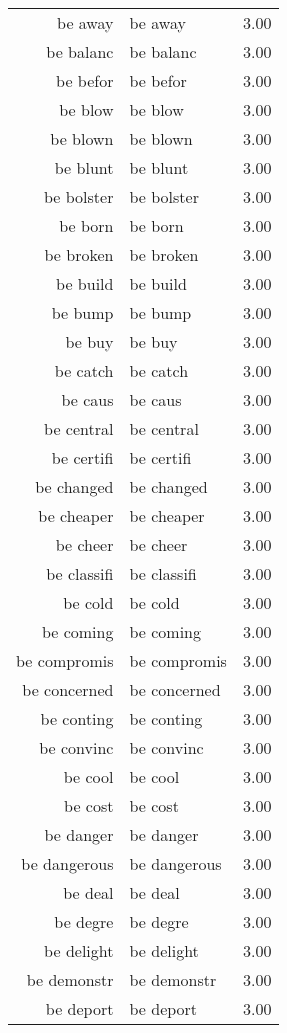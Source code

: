 \begin{table}[ht]
\begin{tabular}{rlr}
  be away & be away & 3.00 \\ 
  be balanc & be balanc & 3.00 \\ 
  be befor & be befor & 3.00 \\ 
  be blow & be blow & 3.00 \\ 
  be blown & be blown & 3.00 \\ 
  be blunt & be blunt & 3.00 \\ 
  be bolster & be bolster & 3.00 \\ 
  be born & be born & 3.00 \\ 
  be broken & be broken & 3.00 \\ 
  be build & be build & 3.00 \\ 
  be bump & be bump & 3.00 \\ 
  be buy & be buy & 3.00 \\ 
  be catch & be catch & 3.00 \\ 
  be caus & be caus & 3.00 \\ 
  be central & be central & 3.00 \\ 
  be certifi & be certifi & 3.00 \\ 
  be changed & be changed & 3.00 \\ 
  be cheaper & be cheaper & 3.00 \\ 
  be cheer & be cheer & 3.00 \\ 
  be classifi & be classifi & 3.00 \\ 
  be cold & be cold & 3.00 \\ 
  be coming & be coming & 3.00 \\ 
  be compromis & be compromis & 3.00 \\ 
  be concerned & be concerned & 3.00 \\ 
  be conting & be conting & 3.00 \\ 
  be convinc & be convinc & 3.00 \\ 
  be cool & be cool & 3.00 \\ 
  be cost & be cost & 3.00 \\ 
  be danger & be danger & 3.00 \\ 
  be dangerous & be dangerous & 3.00 \\ 
  be deal & be deal & 3.00 \\ 
  be degre & be degre & 3.00 \\ 
  be delight & be delight & 3.00 \\ 
  be demonstr & be demonstr & 3.00 \\ 
  be deport & be deport & 3.00 \\ 

\end{tabular}
\end{table}

